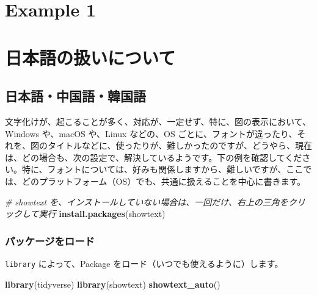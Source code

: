 \documentclass[
  xelatex, ja=standard]{bxjsbook}
\newenvironment{Shaded}{\begin{snugshade}}{\end{snugshade}}
\newcommand{\CommentTok}[1]{\textcolor[rgb]{0.56,0.35,0.01}{\textit{#1}}}
\newcommand{\FunctionTok}[1]{\textcolor[rgb]{0.13,0.29,0.53}{\textbf{#1}}}
\newcommand{\NormalTok}[1]{#1}
\newcommand{\StringTok}[1]{\textcolor[rgb]{0.31,0.60,0.02}{#1}}
\theoremstyle{definition}
\theoremstyle{definition}
\theoremstyle{definition}
\theoremstyle{definition}
\theoremstyle{remark}
\begin{document}
\hypertarget{example1}{%
\chapter{Example 1}\label{example1}}

\hypertarget{appendix-appendix}{%
\appendix}


\hypertarget{japanese}{%
\chapter{日本語の扱いについて}\label{japanese}}

\hypertarget{ux65e5ux672cux8a9eux4e2dux56fdux8a9eux97d3ux56fdux8a9e}{%
\section{日本語・中国語・韓国語}\label{ux65e5ux672cux8a9eux4e2dux56fdux8a9eux97d3ux56fdux8a9e}}

文字化けが、起こることが多く、対応が、一定せず、特に、図の表示において、Windows や、macOS や、Linux などの、OS ごとに、フォントが違ったり、それを、図のタイトルなどに、使ったりが、難しかったのですが、どうやら、現在は、どの場合も、次の設定で、解決しているようです。下の例を確認してください。特に、フォントについては、好みも関係しますから、難しいですが、ここでは、どのプラットフォーム（OS）でも、共通に扱えることを中心に書きます。

\begin{Shaded}
\begin{Highlighting}[]
\CommentTok{\# showtext を、インストールしていない場合は、一回だけ、右上の三角をクリックして実行}
\FunctionTok{install.packages}\NormalTok{(}\StringTok{\textquotesingle{}showtext\textquotesingle{}}\NormalTok{)}
\end{Highlighting}
\end{Shaded}

\hypertarget{ux30d1ux30c3ux30b1ux30fcux30b8ux3092ux30edux30fcux30c9}{%
\subsection{パッケージをロード}\label{ux30d1ux30c3ux30b1ux30fcux30b8ux3092ux30edux30fcux30c9}}

\texttt{library} によって、Package をロード（いつでも使えるように）します。

\begin{Shaded}
\begin{Highlighting}[]
\FunctionTok{library}\NormalTok{(tidyverse)}
\FunctionTok{library}\NormalTok{(showtext) }
\FunctionTok{showtext\_auto}\NormalTok{()}
\end{Highlighting}
\end{Shaded}
\end{document}
